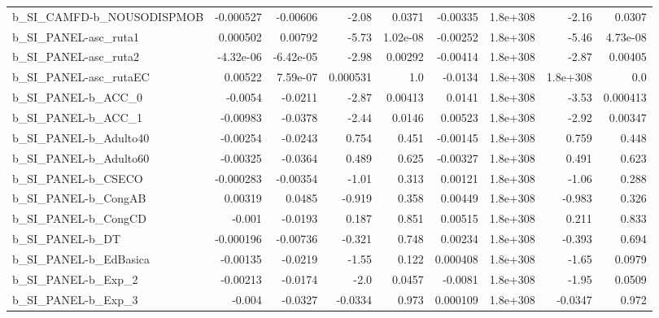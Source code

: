 \begin{tabular}{lrrrrrrrr}
b\_SI\_CAMFD-b\_NOUSODISPMOB    &   -0.000527 &     -0.00606 &     -2.08 &   0.0371 &   -0.00335 &    1.8e+308 &        -2.16 &        0.0307 \\
b\_SI\_PANEL-asc\_ruta1         &    0.000502 &      0.00792 &     -5.73 & 1.02e-08 &   -0.00252 &    1.8e+308 &        -5.46 &      4.73e-08 \\
b\_SI\_PANEL-asc\_ruta2         &   -4.32e-06 &    -6.42e-05 &     -2.98 &  0.00292 &   -0.00414 &    1.8e+308 &        -2.87 &       0.00405 \\
b\_SI\_PANEL-asc\_rutaEC        &     0.00522 &     7.59e-07 &  0.000531 &      1.0 &    -0.0134 &    1.8e+308 &     1.8e+308 &           0.0 \\
b\_SI\_PANEL-b\_ACC\_0           &     -0.0054 &      -0.0211 &     -2.87 &  0.00413 &     0.0141 &    1.8e+308 &        -3.53 &      0.000413 \\
b\_SI\_PANEL-b\_ACC\_1           &    -0.00983 &      -0.0378 &     -2.44 &   0.0146 &    0.00523 &    1.8e+308 &        -2.92 &       0.00347 \\
b\_SI\_PANEL-b\_Adulto40        &    -0.00254 &      -0.0243 &     0.754 &    0.451 &   -0.00145 &    1.8e+308 &        0.759 &         0.448 \\
b\_SI\_PANEL-b\_Adulto60        &    -0.00325 &      -0.0364 &     0.489 &    0.625 &   -0.00327 &    1.8e+308 &        0.491 &         0.623 \\
b\_SI\_PANEL-b\_CSECO           &   -0.000283 &     -0.00354 &     -1.01 &    0.313 &    0.00121 &    1.8e+308 &        -1.06 &         0.288 \\
b\_SI\_PANEL-b\_CongAB          &     0.00319 &       0.0485 &    -0.919 &    0.358 &    0.00449 &    1.8e+308 &       -0.983 &         0.326 \\
b\_SI\_PANEL-b\_CongCD          &      -0.001 &      -0.0193 &     0.187 &    0.851 &    0.00515 &    1.8e+308 &        0.211 &         0.833 \\
b\_SI\_PANEL-b\_DT              &   -0.000196 &     -0.00736 &    -0.321 &    0.748 &    0.00234 &    1.8e+308 &       -0.393 &         0.694 \\
b\_SI\_PANEL-b\_EdBasica        &    -0.00135 &      -0.0219 &     -1.55 &    0.122 &   0.000408 &    1.8e+308 &        -1.65 &        0.0979 \\
b\_SI\_PANEL-b\_Exp\_2           &    -0.00213 &      -0.0174 &      -2.0 &   0.0457 &    -0.0081 &    1.8e+308 &        -1.95 &        0.0509 \\
b\_SI\_PANEL-b\_Exp\_3           &      -0.004 &      -0.0327 &   -0.0334 &    0.973 &   0.000109 &    1.8e+308 &      -0.0347 &         0.972 \\

\end{tabular}
